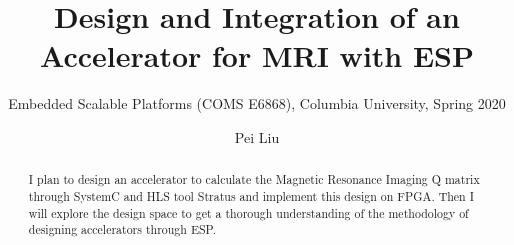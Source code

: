 \documentclass[sigconf, nonacm, screen]{acmart}
\begin{document}
\title{Design and Integration of an Accelerator for MRI with ESP}
\subtitle{Embedded Scalable Platforms (COMS E6868), Columbia University, Spring 2020}

\author{Pei Liu}

\begin{abstract}
I plan to design an accelerator to calculate the Magnetic Resonance Imaging Q
matrix through SystemC and HLS tool Stratus and implement this design on
FPGA. Then I will explore the design space to get a thorough understanding of
the methodology of designing accelerators through ESP.
\end{abstract}

\maketitle










\end{document}
